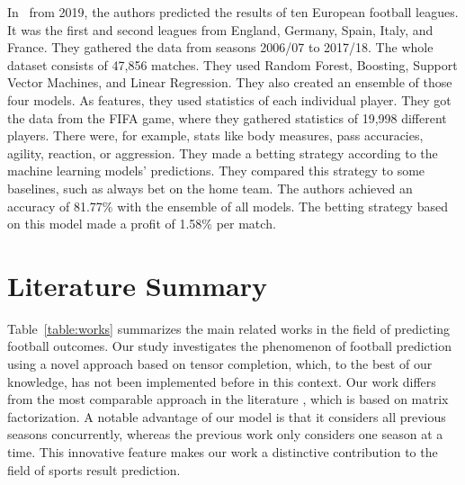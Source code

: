 \documentclass[thesis=M,english]{FITthesis}[2019/12/23]
\begin{document}
In~\cite{football_players} from 2019, the authors predicted the results of ten European football leagues. It was the first and second leagues from England, Germany, Spain, Italy, and France. They gathered the data from seasons 2006/07 to 2017/18. The whole dataset consists of 47,856 matches. They used Random Forest, Boosting, Support Vector Machines, and Linear Regression. They also created an ensemble of those four models. As features, they used statistics of each individual player. They got the data from the FIFA game, where they gathered statistics of 19,998 different players. There were, for example, stats like body measures, pass accuracies, agility, reaction, or aggression. They made a betting strategy according to the machine learning models' predictions. They compared this strategy to some baselines, such as always bet on the home team. The authors achieved an accuracy of 81.77\% with the ensemble of all models. The betting strategy based on this model made a profit of 1.58\% per match.

\section{Literature Summary}
\label{summary}

Table~\ref{table:works} summarizes the main related works in the field of predicting football outcomes. Our study investigates the phenomenon of football prediction using a novel approach based on tensor completion, which, to the best of our knowledge, has not been implemented before in this context. Our work differs from the most comparable approach in the literature \cite{NBA_matrix_factorization}, which is based on matrix factorization. A notable advantage of our model is that it considers all previous seasons concurrently, whereas the previous work only considers one season at a time. This innovative feature makes our work a distinctive contribution to the field of sports result prediction.
\end{document}

